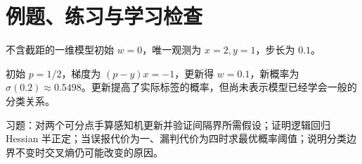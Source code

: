 \section{例题、练习与学习检查}

\begin{example}[一次逻辑回归更新]
不含截距的一维模型初始 $w=0$，唯一观测为 $x=2,y=1$，步长为 $0.1$。
\end{example}
\begin{solve}
初始 $p=1/2$，梯度为 $(p-y)x=-1$，更新得 $w=0.1$，新概率为 $\sigma(0.2)\approx0.5498$。更新提高了实际标签的概率，但尚未表示模型已经学会一般的分类关系。
\end{solve}

习题：对两个可分点手算感知机更新并验证间隔界所需假设；证明逻辑回归 Hessian 半正定；当误报代价为一、漏判代价为四时求最优概率阈值；说明分类边界不变时交叉熵仍可能改变的原因。





